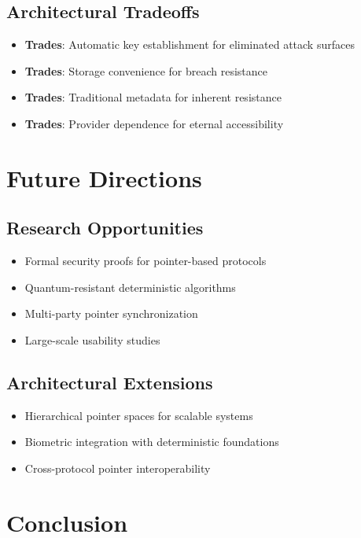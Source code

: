 \documentclass[11pt,a4paper]{article}
\begin{document}
\subsection{Architectural Tradeoffs}

\begin{itemize}
    \item \textbf{Trades}: Automatic key establishment for eliminated attack surfaces
    \item \textbf{Trades}: Storage convenience for breach resistance
    \item \textbf{Trades}: Traditional metadata for inherent resistance
    \item \textbf{Trades}: Provider dependence for eternal accessibility
\end{itemize}

\section{Future Directions}

\subsection{Research Opportunities}

\begin{itemize}
    \item Formal security proofs for pointer-based protocols
    \item Quantum-resistant deterministic algorithms
    \item Multi-party pointer synchronization
    \item Large-scale usability studies
\end{itemize}

\subsection{Architectural Extensions}

\begin{itemize}
    \item Hierarchical pointer spaces for scalable systems
    \item Biometric integration with deterministic foundations
    \item Cross-protocol pointer interoperability
\end{itemize}

\section{Conclusion}
\end{document}
